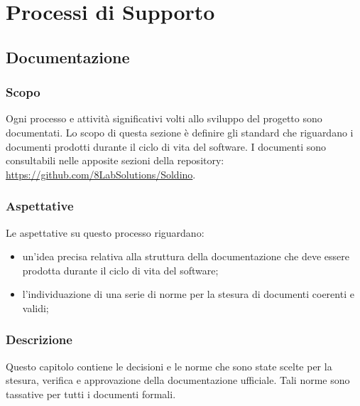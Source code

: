 \section{Processi di Supporto}
\subsection{Documentazione}
	\subsubsection{Scopo}
	Ogni processo e attività significativi volti allo sviluppo del progetto sono documentati. Lo scopo di questa sezione è definire gli standard che riguardano i documenti prodotti durante il ciclo di vita del software.
	I documenti sono consultabili nelle apposite sezioni della repository:\\ \url{https://github.com/8LabSolutions/Soldino}. 		
	\subsubsection{Aspettative}
	Le aspettative su questo processo riguardano:
	\begin{itemize}
		\item un'idea precisa relativa alla struttura della documentazione che deve essere prodotta durante il ciclo di vita del software;
		\item l'individuazione di una serie di norme per la stesura di documenti coerenti e validi;
	\end{itemize}
	\subsubsection{Descrizione}
	Questo capitolo contiene le decisioni e le norme che sono state scelte per la
	stesura, verifica e approvazione della documentazione ufficiale.  Tali norme  sono  tassative  per  tutti  i  documenti  formali.
